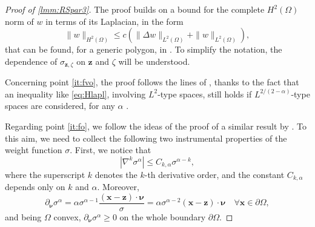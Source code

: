\documentclass[final,hidelinks]{siamart1116Arxiv}
\numberwithin{theorem}{section}
\newcommand{\normal}{{\boldsymbol \nu}}
\begin{document}
\begin{proof}[Proof of \cref{lmm:RSpar3}]
 The proof builds on a bound for the complete $H^2(\Omega)$ norm of $w$ in terms of its Laplacian, in the form
 \begin{equation}\label{eq:Hlapl}
  \|w\|_{H^2(\Omega)} \leq c\left(\|\Delta w\|_{L^2(\Omega)} + \|w\|_{L^2(\Omega)}\right),
 \end{equation}
 that can be found, for a generic polygon, in \cite[Theorem 4.3.1.4]{Grisvard}.
 To simplify the notation, the dependence of $\sigma_{\mathbf z,\zeta}$ on $\mathbf z$ and $\zeta$ will be understood.

 Concerning point \ref{it:fvo}, the proof follows the lines of \cite{RannacherScott}, thanks to the fact that an inequality like \cref{eq:Hlapl}, involving $L^2$-type spaces, still holds if $L^{2/(2-\alpha)}$-type spaces are considered, for any $\alpha$ \cite[Theorem 4.3.2.4]{Grisvard}.
 
 
 
 
 
 
 
 Regarding point \ref{it:fo}, we follow the ideas of the proof of a similar result by \cite{RannacherScott}.
 To this aim, we need to collect the following two instrumental properties of the weight function $\sigma$.
 First, we notice that \cite[(2.2)]{GiraultNochettoScott}
 \begin{equation}\label{eq:GNS}
  |\nabla^k\sigma^\alpha| \leq C_{k,\alpha}\sigma^{\alpha-k},
 \end{equation}
 where the superscript $k$ denotes the $k$-th derivative order, and the constant $C_{k,\alpha}$ depends only on $k$ and $\alpha$.
 Moreover,
 \begin{equation}\label{eq:partnormsigmapos}
  \partial_\normal\sigma^\alpha = \alpha\sigma^{\alpha-1}\frac{(\mathbf x - \mathbf z)\cdot\normal}{\sigma} = \alpha\sigma^{\alpha-2}(\mathbf x - \mathbf z)\cdot\normal \quad \forall\mathbf x\in\partial\Omega,
 \end{equation}
 and being $\Omega$ convex, $\partial_\normal\sigma^\alpha\geq 0$ on the whole boundary $\partial\Omega$.
 

\end{proof}
\end{document}
